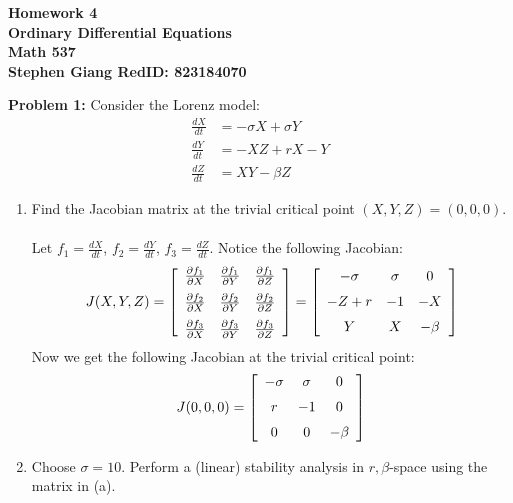 \documentclass[11pt]{article}
\newcommand{\skipline}{\vspace{\baselineskip}}
\newcommand{\spacer}{\noalign{\medskip}}
\newenvironment{problem}[1]{\textbf{Problem #1: }}{\newpage}
\begin{document}
	
	\begin{center}
		\textbf{Homework 4} \\
		\textbf{Ordinary Differential Equations} \\
		\textbf{Math 537} \\
		\textbf{Stephen Giang RedID: 823184070} \\
		\skipline \skipline
	\end{center}

	\begin{problem}{1}
		 Consider the Lorenz model:
		 \begin{align*}
		 	\frac{dX}{dt} &= -\sigma X + \sigma Y \\
		 	\frac{dY}{dt} &= -XZ + rX - Y \\
		 	\frac{dZ}{dt} &= XY -\beta Z
		 \end{align*}
	 	\begin{enumerate}[label = (\alph*)]
	 		\item Find the Jacobian matrix at the trivial critical point $(X,Y,Z) = (0, 0, 0)$. 
	 		\\ \\
	 		Let $f_1 = \frac{dX}{dt}$, $f_2 = \frac{dY}{dt}$, $f_3 = \frac{dZ}{dt}$.  Notice the following Jacobian:
	 		\[J(X,Y,Z) = \left[\begin{array}{ccc}
	 			\frac{\partial f_1}{\partial X} & \frac{\partial f_1}{\partial Y} & \frac{\partial f_1}{\partial Z} \\
	 			\spacer\frac{\partial f_2}{\partial X} & \frac{\partial f_2}{\partial Y} & \frac{\partial f_2}{\partial Z} \\
	 			\spacer\frac{\partial f_3}{\partial X} & \frac{\partial f_3}{\partial Y} & \frac{\partial f_3}{\partial Z} \\
	 		\end{array}\right] = \left[ \begin{array}{ccc}
	 			-\sigma & \sigma & 0 \\
	 			\spacer -Z + r & -1 & -X \\
	 			\spacer Y & X & -\beta
 			\end{array}\right]\]
 			Now we get the following Jacobian at the trivial critical point:
 			\[J(0,0,0) = \left[ \begin{array}{ccc}
 				-\sigma & \sigma & 0 \\
 				\spacer r & -1 & 0 \\
 				\spacer 0 & 0 & -\beta
 			\end{array}\right]\] 
	 		\item Choose $\sigma = 10$.  Perform a (linear) stability analysis in $r,\beta$-space using the matrix in (a). \\

\end{enumerate}
\end{problem}
\end{document}
